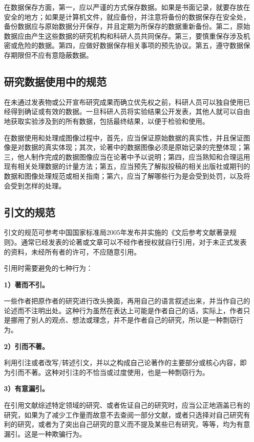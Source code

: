在数据保存方面，第一，应以严谨的方式保存数据。如果是书面记录，就要存放在安全的地方；如果是计算机文件，就应备份，并注意将备份的数据保存在安全处，备份数据应与原始数据分开保存，并且定期为所保存的数据重新备份。第二，原始数据应由产生这些数据的研究机构和科研人员共同保存。第三，要慎重保存涉及机密或危险的数据。第四，应做好数据保存相关事项的预先协议。第五，遵守数据保存期限但不应有意隐蔽数据。

\subsection{研究数据使用中的规范}
在未通过发表物或公开宣布研究成果而确立优先权之前，科研人员可以独自使用已经得到确证或有效的数据。一旦科研人员将实验结果公开发表，其他人就可以自由地获取实验涉及到的所有数据，包括最终结果，以便于检验和使用。

在数据使用和处理成图像过程中，首先，应当保证原始数据的真实性，并且保证图像是对数据的真实体现；其次，论著中的数据图像必须是原始记录的完整体现；第三，他人制作完成的数据图像应当在论著中予以说明；第四，应当熟知和合理运用现有相关处理数据的计量方法；第五，应当预先了解拟投稿的相关出版社或期刊的数据和图像处理规范或相关指南；第六，应当了解哪些行为是会受到处罚，以及将会受到怎样的处理。


\subsection{引文的规范}
引文的规范可参考中国国家标准局2005年发布并实施的《文后参考文献著录规则》。通常已经发表的论著或文章可以不经作者授权就自行引用，对于未正式发表的资料，未经所有者的许可，不应随意引用。

引用时需要避免的七种行为：

\textbf{1）著而不引。}

一些作者把原作者的研究进行改头换面，再用自己的语言叙述出来，并当作自己的论述而不注明出处。这种行为虽然在表达上可能是作者自己的话，实际上，作者只是挪用了别人的观点、想法或理念，并不是作者自己的研究，所以是一种剽窃行为。

\textbf{2）引而不著。}

利用引注或者改写/转述引文，并以之构成自己论著作的主要部分或核心内容，即为引而不著。这种对引注的不恰当或过度使用，也是一种剽窃行为。

\textbf{3）有意漏引。}

在引用文献综述特定领域的研究、或者佐证自己的研究时，应当公正地涵盖已有的研究，如果为了减少工作量而故意不去查阅一部分文献，或者只选择对自己研究有利的研究，或者为了突出自己研究的意义而不提及某些已有研究，等等，均为有意漏引。这是一种欺骗行为。


